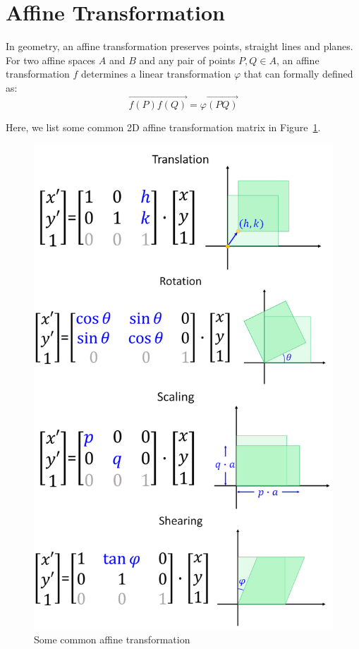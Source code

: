 \section{Affine Transformation}
In geometry, an affine transformation preserves points, straight lines and planes.
For two affine spaces $A$ and $B$ and any pair of points $P, Q \in A$,
an affine transformation $f$ determines a linear transformation $\varphi$ that can formally defined as:
\begin{displaymath}
\overrightarrow{f(P)f(Q)} = \varphi \overrightarrow{(PQ)}
\end{displaymath}

Here, we list some common 2D affine transformation matrix in Figure~\ref{fig:Affine_simple}.

\begin{figure}
\centering
\includegraphics[width=\textwidth]{Affine_simple}
\caption{Some common affine transformation}\label{fig:Affine_simple}
\end{figure}

